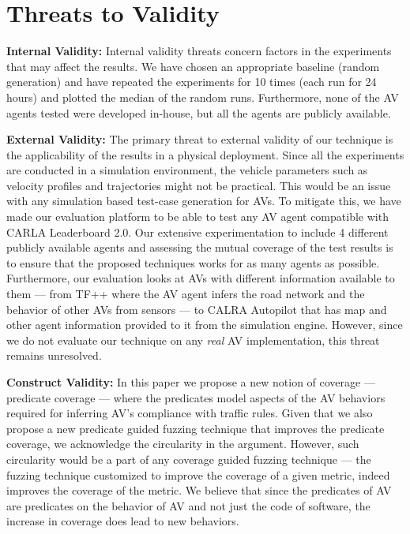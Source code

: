 \section{Threats to Validity}

\textbf{Internal Validity:} Internal validity threats concern factors in the
experiments that may affect the results.
% 
We have chosen an appropriate baseline (random generation) and have repeated the experiments for 10 times (each run for 24 hours) and plotted the median of the random runs.
% 
Furthermore, none of the AV agents tested were developed in-house, but all the agents are publicly available.

\textbf{External Validity:} The primary threat to external validity of our technique is the applicability of the results in a physical deployment.
% 
Since all the experiments are conducted in a simulation environment, the vehicle parameters such as velocity profiles and trajectories might not be practical.
% 
This would be an issue with any simulation based test-case generation for AVs.
% 
To mitigate this, we have made our evaluation platform to be able to test any AV agent compatible with CARLA Leaderboard 2.0.
% 
Our extensive experimentation to include 4 different publicly available agents and assessing the mutual coverage of the test results is to ensure that the proposed techniques works for as many agents as possible.
%
Furthermore, our evaluation looks at AVs with different information available to them --- from TF++ where the AV agent infers the road network and the behavior of other AVs from sensors --- to CALRA Autopilot that has map and other agent information provided to it from the simulation engine. 
% 
However, since we do not evaluate our technique on any \emph{real} AV implementation, this threat remains unresolved.

\textbf{Construct Validity:} In this paper we propose a new notion of coverage --- predicate coverage --- where the predicates model aspects of the AV behaviors required for inferring AV's compliance with traffic rules.
% 
Given that we also propose a new predicate guided fuzzing technique that improves the predicate coverage, we acknowledge the circularity in the argument.
% 
However, such circularity would be a part of any coverage guided fuzzing technique --- the fuzzing technique customized to improve the coverage of a given metric, indeed improves the coverage of the metric.
% 
We believe that since the predicates of AV are predicates on the behavior of AV and not just the code of software, the increase in coverage does lead to new behaviors.
% 


